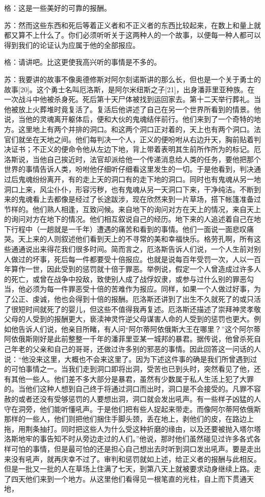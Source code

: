 \documentclass[12pt,oneside]{book}
\begin{document}
格：这是一些美好的可靠的报酬。

苏：然而这些东西和死后等着正义者和不正义者的东西比较起来，在数上和量上就都又算不上什么了。你们必须听听关于这两种人的一个故事，以便每一种人都可以得到我们的论证认为应属于他的全部报应。

格：请讲吧。比这更使我高兴听的事情是不多的。

苏：我要讲的故事不像奥德修斯对阿尔刻诺斯讲的那么长，但也是一个关于勇士的故事[20]。这个勇士名叫厄洛斯，是阿尔米纽斯之子[21]，出身潘菲里亚种族。在一次战斗中他被杀身死。死后第十天尸体被找到运回家去。第十二天举行葬礼。当他被放上火葬堆时竟复活了。复活后他讲述了自己在另一个世界所看到的情景。他说，当他的灵魂离开躯体后，便和大伙的鬼魂结伴前行。他们来到了一个奇特的地方。这里地上有两个并排的洞口。和这两个洞口正对着的，天上也有两个洞口。法官们就坐在天地之间。他们每判决一个人，正义的便吩咐从右边升天，胸前贴着判决证书；不正义的便命令他从左边下地，背上带着表明其生前所作所为的标记。厄洛斯说，当他自己挨近时，法官却派给他一个传递消息给人类的任务，要他把那个世界的事情告诉人类，吩咐他仔细听仔细看这里发生的一切。于是他看到，判决通过后鬼魂纷纷离开，有的走上天的洞口有的走下地的洞口。同时也有鬼魂从另一地洞口上来，风尘仆仆，形容污秽，也有鬼魂从另一天洞口下来，干净纯洁。不断到来的鬼魂看上去都像是经过了长途跋涉，现在欣然来到一片草场，搭下帐篷准备过节样的。他们熟人相逢，互致问候。来自地下的询问对方在天上的情况，来自天上的询问对方在地下的情况。他们相互叙说自己的经历。地下来的人追述着自己在地下行程中（一趟就是一千年）遭遇的痛苦和看到的事情。他们一面说一面悲叹痛哭。天上来的人则叙述他们看到天上的不寻常的美和幸福快乐。格劳孔啊，所有这些通通说出来得花我们很多时间。简而言之，厄洛斯告诉人们说，一个人生前对别人做过的坏事，死后每一件都要受十倍报应。也就是说每百年受罚一次，人以一百年算作一世，因此受到的惩罚就十倍于罪恶。举例说，假定一个人曾造成过许多人的死亡，或曾在战争中投敌，致使别人成了战俘奴隶，或参与过什么别的罪恶勾当，他必须为每一件罪恶受十倍的苦难作为报应。同样，如果一个人做过好事，为了公正、虔诚，他也会得到十倍的报酬。厄洛斯还讲到了出生不久就死了的或只活了很短时间就死了的婴儿，但这些不值得我再复述。厄洛斯还描述了崇拜神灵孝敬父母的人受到的报酬更大，亵渎神灵忤逆父母谋害人命的人受到的惩罚也更大。例如他告诉人们说，他亲目所睹，有人问“阿尔蒂阿依俄斯大王在哪里？”这个阿尔蒂阿依俄斯刚好是此前整整一千年的潘菲里亚某一城邦的暴君。据传说，他曾杀死自己年老的父亲和自己的哥哥，还做过许多别的邪恶的事情。因此回答这一问话的人说：“他没来这里，大概也不会来这里了。因为下述这件事的确是我们所曾遇到过的可怕事情之一。当我们走到洞口即将出洞，受苦也已到头时，突然看见了他，还有其他一些人。他们差不多大部分是暴君，虽然有少数属于私人生活上犯了大罪的。当他们这种人想到自己终于将通过洞口而出时，洞口是不会接受的。凡罪不容赦的或者还没有受够惩罚的人要想出洞，洞口就会发出吼声。有一些样子凶猛的人守在洞旁，他们能听懂吼声。于是他们把有些人捉起来带走。而像阿尔蒂阿依俄斯那样的一些人，他们则把他们捆住手脚头颈，丢在地上，剥他们的皮，在路边上拖，用荆条抽打。同时把这些人为什么受这种折磨的缘由，以及还要被抛入塔尔塔洛斯地牢的事告知不时从旁边走过的人们。”他说，那时他们虽然碰见过许多各式各样可怕的事情，但是最可怕的还是担心自己想出去时听到洞口发出吼声。要是走出来没有吼声，就再庆幸不过了。审判和惩罚就如上述，给正义者的报酬与此相反。但是一批又一批的人在草场上住满了七天，到第八天上就被要求动身继续上路。走了四天他们来到一个地方。从这里他们看得见一根笔直的光柱，自上而下贯通天地，
\end{document}
